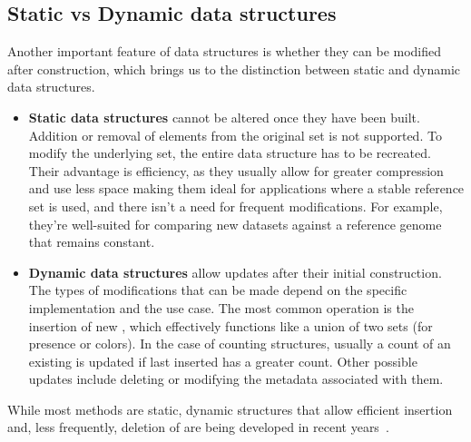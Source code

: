 \subsection{Static vs Dynamic data structures}
\label{sec:staticdynamic}
Another important feature of \kmer data structures is whether they can be modified after construction, which brings us to the distinction between static and dynamic data structures.\\
\begin{itemize}
	\item \textbf{Static data structures} cannot be altered once they have been built.  Addition or removal of elements from the original set is not supported. To modify the underlying set, the entire data structure has to be recreated. Their advantage is efficiency, as they usually allow for greater compression and use less space making them ideal for applications where a stable reference set is used, and there isn’t a need for frequent modifications. For example, they’re well-suited for comparing new datasets against a reference genome that remains constant.
	\item \textbf{Dynamic data structures} allow updates after their initial construction. The types of modifications that can be made depend on the specific implementation and the use case. The most common operation is the insertion of new \kmers, which effectively functions like a union of two sets (for presence or colors). In the case of counting structures, usually a count of an existing \kmer is updated if last inserted has a greater count. Other possible updates include deleting \kmers or modifying the metadata associated with them.
\end{itemize}
While most methods are static, dynamic structures that allow efficient insertion and, less frequently, deletion of \kmers are being developed in recent years~\cite{marchet2024kmersets}.

